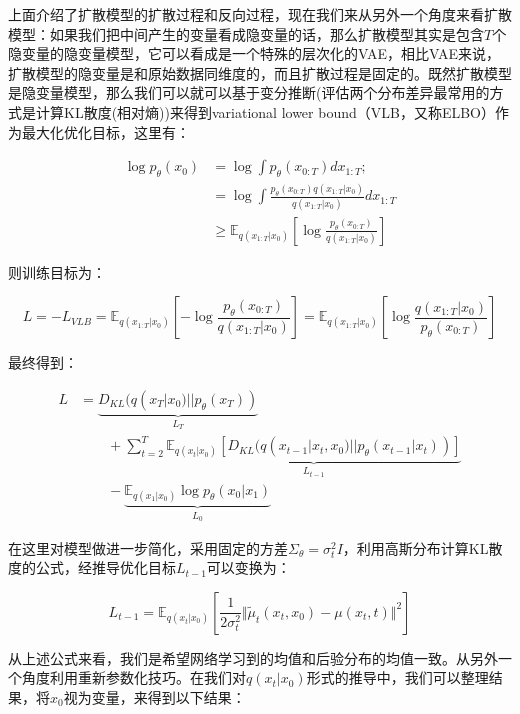 上面介绍了扩散模型的扩散过程和反向过程，现在我们来从另外一个角度来看扩散模型：如果我们把中间产生的变量看成隐变量的话，那么扩散模型其实是包含$T$个隐变量的隐变量模型，它可以看成是一个特殊的层次化的VAE，相比VAE来说，扩散模型的隐变量是和原始数据同维度的，而且扩散过程是固定的。既然扩散模型是隐变量模型，那么我们可以就可以基于变分推断(评估两个分布差异最常用的方式是计算KL散度(相对熵))来得到variational lower bound（VLB，又称ELBO）作为最大化优化目标，这里有：

$$\begin{aligned}
\log{p_{\theta}(x_0)} &= \log{\int{p_{\theta}(x_{0:T})dx_{1:T}}};\\
&=\log{\int{\frac{p_{\theta}(x_{0:T})q(x_{1:T}|x_0)}{q(x_{1:T}|x_0)}dx_{1:T}}} \\
&\ge \mathbb{E}_{q(x_{1:T}|x_0)}[\log{\frac{p_{\theta}(x_{0:T})}{q(x_{1:T}|x_0)}}]
\end{aligned}$$

则训练目标为：

\begin{equation}\label{eqn-18}
L = - L_{VLB} = \mathbb{E}_{q(x_{1:T}|x_0)}[-\log{\frac{p_{\theta}(x_{0:T})}{q(x_{1:T}|x_0)}}] = \mathbb{E}_{q(x_{1:T}|x_0)}[\log{\frac{q(x_{1:T}|x_0)}{p_{\theta}(x_{0:T})}}]
\end{equation}

最终得到：

$$\begin{aligned}
      L &= \underbrace{D_{KL}(q(x_T|x_0) || p_\theta(x_T))}_{L_T} \\
      &\qquad + \sum^T_{t=2}{\underbrace{\mathbb{E}_{q(x_t|x_0)}[D_{KL}(q(x_{t-1}|x_t,x_0) || p_\theta(x_{t-1}|x_t))]}_{L_{t-1}}} \\
      &\qquad- \underbrace{\mathbb{E}_{q(x_1|x_0)}\log{p_\theta(x_0|x_1)}}_{L_0}
\end{aligned}$$

在这里对模型做进一步简化，采用固定的方差$\Sigma_\theta=\sigma^2_tI$，利用高斯分布计算KL散度的公式，经推导优化目标$L_{t-1}$可以变换为：

\begin{equation}\label{eqn-21}
L_{t-1}=\mathbb{E}_{q(x_t|x_0)}[\frac{1}{2\sigma^2_t}\Vert \widetilde{\mu}_t(x_t,x_0)-\mu(x_t,t) \Vert^2]
\end{equation}

从上述公式来看，我们是希望网络学习到的均值和后验分布的均值一致。从另外一个角度利用重新参数化技巧。在我们对$q ( x_t | x_0 )$形式的推导中，我们可以整理结果，将$x_0$视为变量，来得到以下结果：

